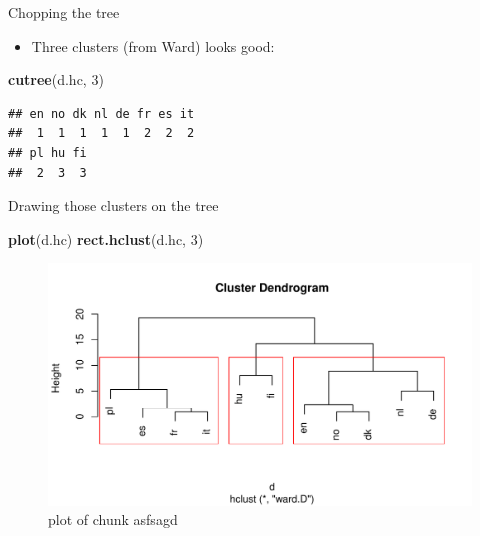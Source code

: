 \documentclass[ignorenonframetext,]{beamer}
\newenvironment{Shaded}{\begin{snugshade}}{\end{snugshade}}
\newcommand{\DecValTok}[1]{\textcolor[rgb]{0.00,0.00,0.81}{#1}}
\newcommand{\KeywordTok}[1]{\textcolor[rgb]{0.13,0.29,0.53}{\textbf{#1}}}
\newcommand{\NormalTok}[1]{#1}
\providecommand{\tightlist}{%
  \setlength{\itemsep}{0pt}\setlength{\parskip}{0pt}}
\begin{document}
\begin{frame}[fragile]{Chopping the tree}
\protect\hypertarget{chopping-the-tree}{}

\begin{itemize}
\tightlist
\item
  Three clusters (from Ward) looks good:
\end{itemize}

\begin{Shaded}
\begin{Highlighting}[]
\KeywordTok{cutree}\NormalTok{(d.hc, }\DecValTok{3}\NormalTok{)}
\end{Highlighting}
\end{Shaded}

\begin{verbatim}
## en no dk nl de fr es it 
##  1  1  1  1  1  2  2  2 
## pl hu fi 
##  2  3  3
\end{verbatim}

\end{frame}

\begin{frame}[fragile]{Drawing those clusters on the tree}
\protect\hypertarget{drawing-those-clusters-on-the-tree}{}

\begin{Shaded}
\begin{Highlighting}[]
\KeywordTok{plot}\NormalTok{(d.hc)}
\KeywordTok{rect.hclust}\NormalTok{(d.hc, }\DecValTok{3}\NormalTok{)}
\end{Highlighting}
\end{Shaded}

\begin{figure}
\centering
\includegraphics{figure/asfsagd-1.pdf}
\caption{plot of chunk asfsagd}
\end{figure}

\end{frame}
\end{document}
